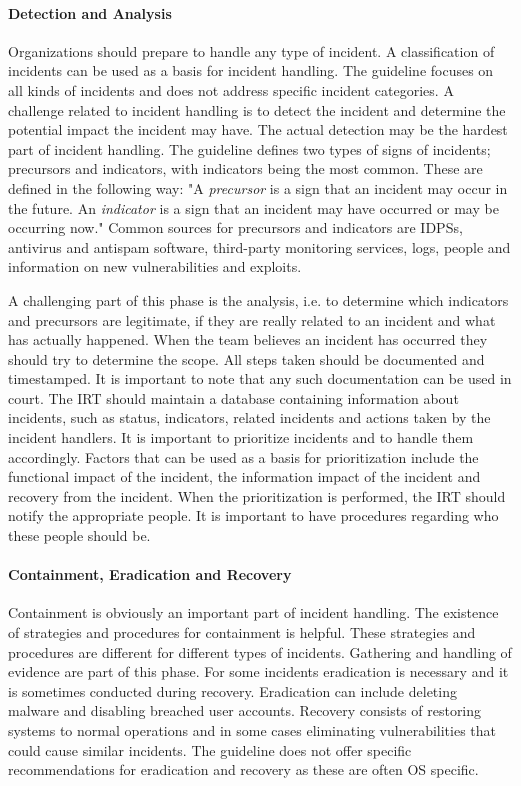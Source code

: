 \paragraph{Detection and Analysis}
Organizations should prepare to handle any type of incident. A classification of incidents can be used as a basis for incident handling. The guideline focuses on all kinds of incidents and does not address specific incident categories. A challenge related to incident handling is to detect the incident and determine the potential impact the incident may have. The actual detection may be the hardest part of incident handling. The guideline defines two types of signs of incidents; precursors and indicators, with indicators being the most common. These are defined in the following way: "A \emph{precursor} is a sign that an incident may occur in the future. An \emph{indicator} is a sign that an incident may have occurred or may be occurring now." Common sources for precursors and indicators are \acp{IDPS}, antivirus and antispam software, third-party monitoring services, logs, people and information on new vulnerabilities and exploits. 

A challenging part of this phase is the analysis, i.e. to determine which indicators and precursors are legitimate, if they are really related to an incident and what has actually happened. When the team believes an incident has occurred they should try to determine the scope. All steps taken should be documented and timestamped. It is important to note that any such documentation can be used in court. The \ac{IRT} should maintain a database containing information about incidents, such as status, indicators, related incidents and actions taken by the incident handlers. It is important to prioritize incidents and to handle them accordingly. Factors that can be used as a basis for prioritization include the functional impact of the incident, the information impact of the incident and recovery from the incident. When the prioritization is performed, the \ac{IRT} should notify the appropriate people. It is important to have procedures regarding who these people should be.

\paragraph{Containment, Eradication and Recovery}
Containment is obviously an important part of incident handling. The existence of strategies and procedures for containment is helpful. These strategies and procedures are different for different types of incidents. Gathering and handling of evidence are part of this phase. For some incidents eradication is necessary and it is sometimes conducted during recovery. Eradication can include deleting malware and disabling breached user accounts. Recovery consists of restoring systems to normal operations and in some cases eliminating vulnerabilities that could cause similar incidents. The guideline does not offer specific recommendations for eradication and recovery as these are often OS specific. 

